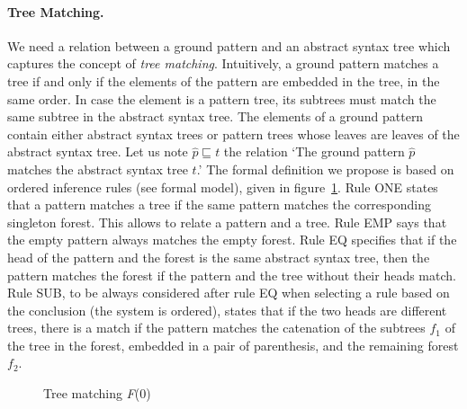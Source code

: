 \paragraph{Tree Matching.}

We need a relation between a ground pattern and an abstract syntax
tree which captures the concept of \emph{tree matching}. Intuitively,
a ground pattern matches a tree if and only if the elements of the
pattern are embedded in the tree, in the same order. In case the
element is a pattern tree, its subtrees must match the same subtree in
the abstract syntax tree. The elements of a ground pattern contain
either abstract syntax trees or pattern trees whose leaves are leaves
of the abstract syntax tree. Let us note \(\hat{p} \sqsubseteq t\) the
relation `The ground pattern \(\hat{p}\) matches the abstract syntax
tree \(t\).' The formal definition we propose is based on ordered
inference rules (see formal model), given in
figure~\ref{f0_tree_matching_def}. Rule \textsf{ONE} states that a
pattern matches a tree if the same pattern matches the corresponding
singleton forest. This allows to relate a pattern and a tree. Rule
\textsf{EMP} says that the empty pattern always matches the empty
forest. Rule \textsf{EQ} specifies that if the head of the pattern and
the forest is the same abstract syntax tree, then the pattern matches
the forest if the pattern and the tree without their heads match. Rule
\textsf{SUB}, to be always considered after rule \textsf{EQ} when
selecting a rule based on the conclusion (the system is ordered),
states that if the two heads are different trees, there is a match if
the pattern matches the catenation of the subtrees \(f_1\) of the tree
in the forest, embedded in a pair of parenthesis, and the remaining
forest \(f_2\).
\begin{figure}
\caption{Tree matching \textit{F}(0)\label{f0_tree_matching_def}}
\end{figure}

